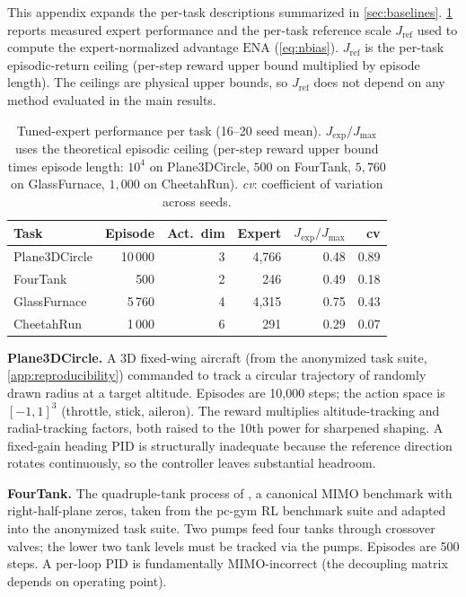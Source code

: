 \documentclass{article}
\newcommand{\nbias}{\mathrm{ENA}}
\begin{document}
This appendix expands the per-task descriptions summarized in
\cref{sec:baselines}. \cref{tab:expert_headroom} reports
measured expert performance and the per-task reference scale
$J_{\mathrm{ref}}$ used to compute the expert-normalized advantage
$\nbias$ (\cref{eq:nbias}). $J_{\mathrm{ref}}$ is the per-task
episodic-return ceiling (per-step reward upper bound multiplied by
episode length). The ceilings are physical upper bounds, so
$J_{\mathrm{ref}}$ does not depend on any method evaluated in the
main results.

\begin{table}[h]
\centering
\small
\renewcommand{\arraystretch}{1.1}
\begin{tabular}{lrrrrr}
\toprule
\textbf{Task} & \textbf{Episode} & \textbf{Act.\ dim} &
\textbf{Expert} & \textbf{$J_{\mathrm{exp}}/J_{\max}$} & \textbf{cv} \\
\midrule
Plane3DCircle   & 10\,000 & 3  & 4{,}766 & 0.48 & 0.89 \\
FourTank        & 500     & 2  & 246     & 0.49 & 0.18 \\
GlassFurnace    & 5\,760  & 4  & 4{,}315 & 0.75 & 0.43 \\
CheetahRun      & 1\,000  & 6  & 291     & 0.29 & 0.07 \\
\bottomrule
\end{tabular}
\caption{Tuned-expert performance per task (16--20 seed mean).
$J_{\mathrm{exp}}/J_{\max}$ uses the theoretical episodic ceiling
(per-step reward upper bound times episode length: $10^4$ on
Plane3DCircle, $500$ on FourTank, $5{,}760$ on GlassFurnace, $1{,}000$
on CheetahRun). \emph{cv}: coefficient of variation across seeds.}
\label{tab:expert_headroom}
\end{table}

\textbf{Plane3DCircle.} A 3D fixed-wing aircraft (from the anonymized
task suite, \cref{app:reproducibility})
commanded to track a circular trajectory of randomly drawn radius at a target
altitude. Episodes are 10{,}000 steps; the action space is $[-1,1]^3$
(throttle, stick, aileron). The reward multiplies altitude-tracking and
radial-tracking factors, both raised to the 10th power for sharpened
shaping. A fixed-gain heading PID is structurally inadequate because
the reference direction rotates continuously, so the controller leaves
substantial headroom.

\textbf{FourTank.} The quadruple-tank process of
\citet{johansson2000quadruple}, a canonical MIMO benchmark with
right-half-plane zeros, taken from the pc-gym RL benchmark suite
\citep{bloor2024pcgym} and adapted into the anonymized task suite.
Two pumps feed four tanks through crossover valves; the lower two
tank levels must be tracked via the pumps. Episodes are 500 steps.
A per-loop PID is fundamentally MIMO-incorrect (the decoupling
matrix depends on operating point).
\end{document}
